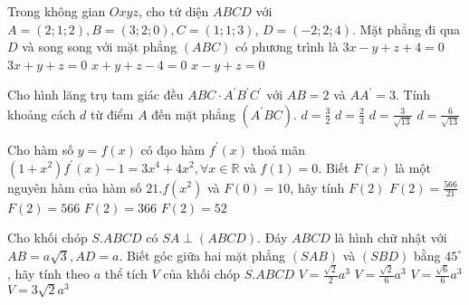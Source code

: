 \begin{ex} 
 Trong không gian $O x y z$, cho tứ diện $A B C D$ với $A=(2 ; 1 ; 2), B=(3 ; 2 ; 0), C=(1 ; 1 ; 3)$, $D=(-2 ; 2 ; 4)$. Mặt phẳng đi qua $D$ và song song với mặt phẳng $(A B C)$ có phương trình là
\choice 
 { $3 x-y+z+4=0$} 
 { $3 x+y+z=0$} 
 { $x+y+z-4=0$} 
 { $x-y+z=0$}
\end{ex} 
 
 \begin{ex} 
 Cho hình lăng trụ tam giác đều $A B C \cdot A^{\prime} B^{\prime} C^{\prime}$ với $A B=2$ và
$A A^{\prime}=3$. Tính khoảng cách $d$ từ điểm $A$ đến mặt phẳng $\left(A^{\prime} B C\right)$.
\choice 
 { $d=\frac{3}{2}$} 
 { $d=\frac{2}{3}$} 
 { $d=\frac{3}{\sqrt{13}}$} 
 { $d=\frac{6}{\sqrt{13}}$}
\end{ex} 

 
\begin{ex} 
 Cho hàm số $y=f(x)$ có đạo hàm $f^{\prime}(x)$ thoả mãn $\left(1+x^{2}\right) f^{\prime}(x)-1=3 x^{4}+4 x^{2}, \forall x \in \mathbb{R}$ và $f(1)=0$. Biết $F(x)$ là một nguyên hàm của hàm số $21 . f\left(x^{2}\right)$ và $F(0)=10$, hãy tính $F(2)$
\choice
 { $F(2)=\frac{566}{21}$}
 { $F(2)=566$} 
 { $F(2)=366$} 
 { $F(2)=52$}
\end{ex} 
 
\begin{ex} 
 Cho khối chóp $S . A B C D$ có $S A \perp(A B C D)$. Đáy $A B C D$ là hình chữ nhật với $A B=a \sqrt{3}, A D=a$. Biết góc giữa hai mặt phẳng $(S A B)$ và $(S B D)$ bằng $45^{\circ}$, hãy tính theo $a$ thể tích $V$ của khối chóp $S . A B C D$ 
 \choice 
{ $V=\frac{\sqrt{2}}{2} a^{3}$} 
 { $V=\frac{\sqrt{2}}{6} a^{3}$}
{ $V=\frac{\sqrt{6}}{6} a^{3}$} 
 { $V=3 \sqrt{2} a^{3}$}
\end{ex} 
 
